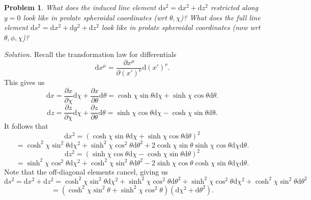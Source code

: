 \documentclass[11pt, letterpaper]{article}
\theoremstyle{plain}
\newtheorem{problem}{Problem}[section]
\begin{document}
\begin{problem}
	What does the induced line element $\mathrm{d} s^2=\mathrm{d} x^2+\mathrm{d} z^2$ restricted along $y=0$ look like in prolate spheroidal coordinates (wrt $\theta ,\chi $)? What does the full line element $\mathrm{d} s^2=\mathrm{d} x^2+\mathrm{d} y^2+\mathrm{d} z^2$ look like in prolate spheroidal coordinates (now wrt $\theta ,\phi ,\chi $)?
\end{problem}
\noindent\emph{Solution.} Recall the transformation law for differentials
\[
	\mathrm{d} x^\mu =\frac{\partial x^\mu }{\partial (x')^\nu } \mathrm{d} (x')^\nu 
.\]
This gives us
\[
	\mathrm{d} x=\frac{\partial x}{\partial \chi } \mathrm{d} \chi +\frac{\partial x}{\partial \theta } \mathrm{d} \theta =\cosh\chi \sin \theta \mathrm{d} \chi +\sinh\chi \cos \theta \mathrm{d} \theta 
.\]
\[
	\mathrm{d} z=\frac{\partial z}{\partial \chi } \mathrm{d} \chi +\frac{\partial z}{\partial \theta } \mathrm{d} \theta =\sinh\chi \cos \theta\mathrm{d}\chi -\cosh\chi \sin \theta \mathrm{d\theta } 
.\]
It follows that
\[
	\mathrm{d} x^2=\left( \cosh\chi \sin \theta \mathrm{d} \chi +\sinh\chi \cos \theta \mathrm{d} \theta  \right) ^2
\]
\[
	=\cosh^2\chi \sin ^2\theta \mathrm{d} \chi ^2+\sinh^2\chi \cos ^2\theta \mathrm{d} \theta ^2+2\cosh\chi \sin \theta \sinh\chi \cos \theta \mathrm{d} \chi \mathrm{d} \theta 
.\]
\[
	\mathrm{d} z^2=\left( \sinh\chi \cos \theta \mathrm{d} \chi -\cosh\chi \sin \theta \mathrm{d} \theta  \right) ^2
\]
\[
	=\sinh^2\chi \cos ^2\theta \mathrm{d} \chi ^2+\cosh^2\chi \sin ^2\theta \mathrm{d} \theta ^2-2 \sinh\chi \cos \theta \cosh\chi \sin \theta \mathrm{d} \chi \mathrm{d} \theta 
.\]
Note that the off-diagonal elements cancel, giving us
\[
	\mathrm{d} s^2=\mathrm{d} x^2+\mathrm{d} z^2=\cosh^2\chi \sin ^2\theta \mathrm{d} \chi ^2+\sinh^2\chi \cos ^2\theta \mathrm{d} \theta ^2+\sinh^2\chi \cos ^2\theta \mathrm{d} \chi ^2+\cosh^2\chi \sin ^2\theta \mathrm{d}\theta ^2
\]
\[
	=\left( \cosh^2\chi \sin ^2\theta +\sinh^2\chi \cos ^2\theta  \right)\left( \mathrm{d} \chi ^2+\mathrm{d} \theta ^2 \right) 
.\]
\end{document}
